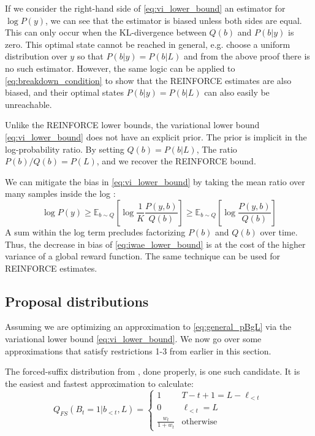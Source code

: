 \documentclass{article}
\begin{document}
If we consider the right-hand side of \cref{eq:vi_lower_bound} an estimator for
$\log P(y)$, we can see that the estimator is biased unless both sides are
equal. This can only occur when the KL-divergence between $Q(b)$ and $P(b|y)$
is zero. This optimal state cannot be reached in general, e.g. choose a uniform
distribution over $y$ so that $P(b|y) = P(b|L)$ and from the above proof there
is no such estimator. However, the same logic can be applied to
\cref{eq:breakdown_condition} to show that the REINFORCE estimates are also
biased, and their optimal states $P(b|y) = P(b|L)$ can also easily be
unreachable.

Unlike the REINFORCE lower bounds, the variational lower bound
\cref{eq:vi_lower_bound} does not have an explicit prior. The prior is implicit
in the log-probability ratio. By setting $Q(b) = P(b|L)$, The ratio $P(b) /
Q(b) = P(L)$, and we recover the REINFORCE bound.

We can mitigate the bias in \cref{eq:vi_lower_bound} by taking the mean ratio
over many samples inside the log
\cite{burdaImportanceWeightedAutoencoders2016}:
%
\begin{equation} \label{eq:iwae_lower_bound}
    \log P(y) \geq \mathbb{E}_{b \sim Q} \left[
        \log \frac{1}{K} \frac{P(y, b)}{Q(b)} \right]
    \geq \mathbb{E}_{b \sim Q} \left[\log \frac{P(y, b)}{Q(b)}\right]
\end{equation}
%
A sum within the log term precludes factorizing $P(b)$ and $Q(b)$ over time.
Thus, the decrease in bias of \cref{eq:iwae_lower_bound} is at the cost of
the higher variance of a global reward function. The same technique can be used
for REINFORCE estimates.

\subsection{Proposal distributions}

Assuming we are optimizing an approximation to \cref{eq:general_pBgL} via
the variational lower bound \cref{eq:vi_lower_bound}. We now go over some
approximations that satisfy restrictions 1-3 from earlier in this section.

The forced-suffix distribution from
\cite{luoLearningOnlineAlignments2017,lawsonLearningHardAlignments2018}, done
properly, is one such candidate. It is the easiest and fastest approximation to
calculate:
%
\begin{equation} \label{eq:q_fs}
    Q_{FS}(B_t=1|b_{<t}, L) = \begin{cases}
        1 & T - t + 1 = L - \ell_{<t} \\
        0 & \ell_{<t} = L \\
        \frac{w_t}{1 + w_t} & \mathrm{otherwise}
    \end{cases}
\end{equation}
\end{document}
